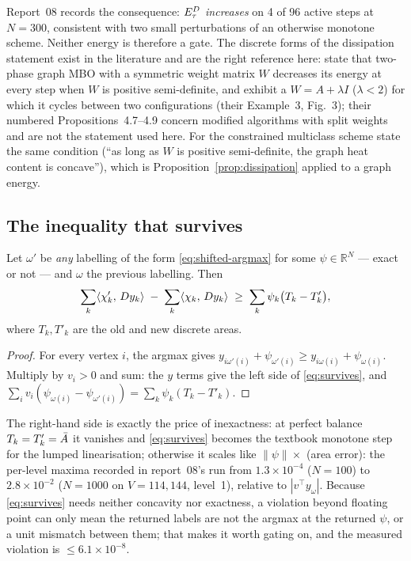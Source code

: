 \documentclass[11pt,a4paper]{article}
\begin{document}
Report~08 records the consequence: $E^{D}_\tau$ \emph{increases} on 4 of
96 active steps at $N = 300$, consistent with two small perturbations of an
otherwise monotone scheme. Neither energy is therefore a gate. The discrete
forms of the dissipation statement exist in the literature and are the right
reference here: \cite[\S4.4]{esedoglu2017kernels} state that two-phase graph MBO
with a symmetric weight matrix $W$ decreases its energy at every step when $W$ is
positive semi-definite, and exhibit a $W = A + \lambda I$ ($\lambda < 2$) for which
it cycles between two configurations (their Example~3, Fig.~3); their numbered
Propositions~4.7--4.9 concern modified algorithms with split weights and are
not the statement used here. For the constrained multiclass scheme
\cite[\S5.2]{jacobs2018auction} state the same condition (``as long as $W$ is
positive semi-definite, the graph heat content is concave''), which is
Proposition~\ref{prop:dissipation} applied to a graph energy.

\subsection{The inequality that survives}
\label{sec:survives}

\begin{prop}
\label{prop:survives}
Let $\omega'$ be \emph{any} labelling of the form \eqref{eq:shifted-argmax} for
some $\psi \in \mathbb{R}^N$ --- exact or not --- and $\omega$ the previous
labelling. Then
\begin{equation}
  \sum_k \langle \chi'_k,\, D y_k \rangle \;-\; \sum_k \langle \chi_k,\, D y_k \rangle
  \;\ge\; \sum_k \psi_k \bigl( T_k - T'_k \bigr),
  \label{eq:survives}
\end{equation}
where $T_k, T'_k$ are the old and new discrete areas.
\end{prop}
\begin{proof}
For every vertex $i$, the argmax gives
$y_{i\omega'(i)} + \psi_{\omega'(i)} \ge y_{i\omega(i)} + \psi_{\omega(i)}$.
Multiply by $v_i > 0$ and sum: the $y$ terms give the left side of
\eqref{eq:survives}, and $\sum_i v_i (\psi_{\omega(i)} - \psi_{\omega'(i)})
= \sum_k \psi_k (T_k - T'_k)$.
\end{proof}

The right-hand side is exactly the price of inexactness: at perfect balance
$T_k = T'_k = \bar{A}$ it vanishes and \eqref{eq:survives} becomes the textbook
monotone step for the lumped linearisation; otherwise it scales like
$\|\psi\| \times$ (area error): the per-level maxima recorded in report~08's
 run from $1.3 \times 10^{-4}$ ($N = 100$) to $2.8 \times 10^{-2}$
($N = 1000$ on $V = 114{,}144$, level~1), relative to $|v^\top y_{\omega}|$. Because
\eqref{eq:survives} needs neither concavity nor exactness, a violation beyond
floating point can only mean the returned labels are not the argmax at the
returned $\psi$, or a unit mismatch between them; that makes it worth gating on,
and the measured violation is $\le 6.1 \times 10^{-8}$.
\end{document}
